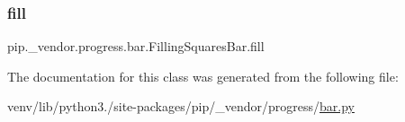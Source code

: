 \subsubsection{\texorpdfstring{fill}{fill}}
{\footnotesize\ttfamily pip.\+\_\+vendor.\+progress.\+bar.\+Filling\+Squares\+Bar.\+fill\hspace{0.3cm}{\ttfamily [static]}}



The documentation for this class was generated from the following file\+:\begin{DoxyCompactItemize}
\item 
venv/lib/python3./site-\/packages/pip/\+\_\+vendor/progress/\hyperlink{bar_8py}{bar.\+py}\end{DoxyCompactItemize}
